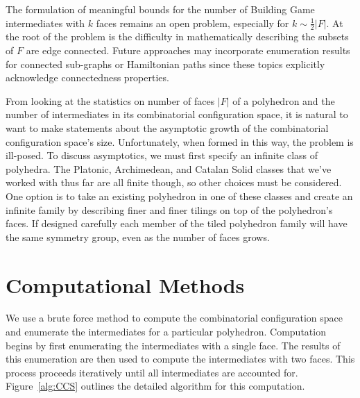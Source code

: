 The formulation of meaningful bounds for the number of Building Game intermediates with $k$ faces remains an open problem, especially for $k \sim \frac{1}{2}|F|$. At the root of the problem is the difficulty in mathematically describing the subsets of $F$ are edge connected. Future approaches may incorporate enumeration results for connected sub-graphs or Hamiltonian paths since these topics explicitly acknowledge connectedness properties. 

From looking at the statistics on number of faces $|F|$ of a polyhedron and the number of intermediates in its combinatorial configuration space, it is natural to want to make statements about the asymptotic growth of the combinatorial configuration space's size. Unfortunately, when formed in this way, the problem is ill-posed. To discuss asymptotics, we must first specify an infinite class of polyhedra. The Platonic, Archimedean, and Catalan Solid classes that we've worked with thus far are all finite though, so other choices must be considered. One option is to take an existing polyhedron in one of these classes and create an infinite family by describing finer and finer tilings on top of the polyhedron's faces. If designed carefully each member of the tiled polyhedron family will have the same symmetry group, even as the number of faces grows. 


\section{Computational Methods}

We use a brute force method to compute the combinatorial configuration space and enumerate the intermediates for a particular polyhedron. Computation begins by first enumerating the intermediates with a single face. The results of this enumeration are then used to compute the intermediates with two faces. This process proceeds iteratively until all intermediates are accounted for. Figure~\ref{alg:CCS} outlines the detailed algorithm for this computation. 

